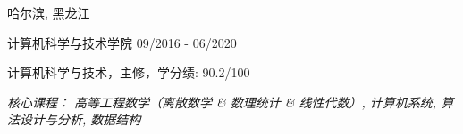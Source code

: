 \vspace{-6.0mm}

\begin{cventries}
\vspace{-1.5mm}

\cveducation
{}
{哈尔滨, 黑龙江}

\cvsubeducation
{计算机科学与技术学院}
{09/2016 - 06/2020}
{
    \begin{cvitems}
    \item {计算机科学与技术，主修，学分绩: 90.2/100}
    \item {\itshape{核心课程： 高等工程数学（离散数学 \& 数理统计 \& 线性代数）, 计算机系统, 算法设计与分析, 数据结构}}
    \end{cvitems}
}

\end{cventries}